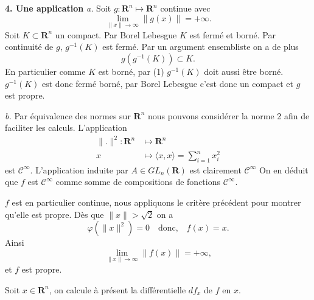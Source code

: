 \documentclass[12pt]{article}
\newcommand{\R}{\mathbf{R}}
\begin{document}
\textbf{4. Une application} \textit{a.} Soit $g : \R^{n} \longmapsto \R^{n}$ continue avec  
\begin{equation}
        \lim_{\|x\|\to \infty}\|g(x)\| = +\infty.
\end{equation}
Soit $K \subset \R^{n}$ un compact. Par Borel Lebesgue $K$ est fermé et borné. Par continuité de $g$, $g^{-1}(K)$ est fermé. Par un argument ensembliste on a de plus \[
g(g^{-1}(K)) \subset K
.\] En particulier comme $K$ est borné, par (1) $g^{-1}(K)$ doit aussi être borné. $g^{-1}(K)$ est donc fermé borné, par Borel Lebesgue c'est donc un compact et $g$ est propre. 

\medskip

\textit{b.} Par équivalence des normes sur $\R^{n}$ nous pouvons considérer la norme 2 afin de faciliter les calculs. L'application
\begin{align*}
        \|.\|^{2} : \R^{n} &\longmapsto \R^{n} \\
        x &\longmapsto \langle x, x \rangle = \sum_{i=1}^{n}x_{i}^{2}
\end{align*} est $\mathcal{C}^{\infty}$. L'application induite par $A \in GL_{n}(\R)$ est clairement $\mathcal{C}^{\infty}$ On en déduit que $f$ est $\mathcal{C}^{\infty}$ comme somme de compositions de fonctions $\mathcal{C}^{\infty}$.


$f$ est en particulier continue, nous appliquons le critère précédent pour montrer qu'elle est propre. Dès que $\|x\| > \sqrt{2}$ on a \[
        \varphi(\|x\|^{2}) = 0 \quad \text{donc,} \quad f(x) = x
.\] Ainsi \[
\lim_{\|x\|\to \infty}\|f(x)\| = +\infty
,\] et $f$ est propre. 

Soit $x \in \R^{n}$, on calcule à présent la différentielle $df_{x}$ de $f$ en $x$.
\end{document}
